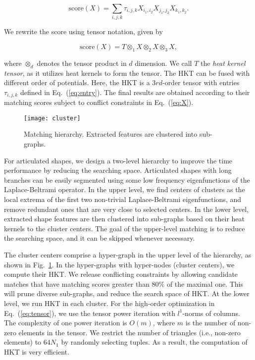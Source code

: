 \begin{equation}
\mbox{score}(X)=\sum_{i,j,k} \tau_{i,j,k} X_{i_{1},i_{2}} X_{j_{1},j_{2}} X_{k_{1},k_{2}}.
\end{equation}

We rewrite the score using tensor notation, given by

\begin{equation}\label{eq:tensor}
\mbox{score}(X)=T\otimes_{1}X\otimes_{2}X\otimes_{3}X,
\end{equation}

where $\otimes_{d}$ denotes the tensor product in $d$ dimension. We call $T$ the \emph{heat kernel tensor}, as it utilizes heat kernels to form the tensor. The HKT can be fused with different order of potentials. Here, the HKT is a $3rd$-order tensor with entries $\tau_{i,j,k}$ defined in Eq.~(\ref{eq:entry}). The final results are obtained according to their matching scores subject to conflict constraints in Eq.~(\ref{eq:X}).

\begin{figure}
\centering
\texttt{[image: cluster]}\\
\caption[Matching hierarchy.]
{Matching hierarchy. Extracted features are clustered into sub-graphs.}
\label{fig:cluster}
\end{figure}

For articulated shapes, we design a two-level hierarchy to improve the time performance by
reducing the searching space. Articulated shapes with long branches can be easily segmented
using some low frequency eigenfunctions of the Laplace-Beltrami operator. In the upper
level, we find centers of clusters as the local extrema of the first two non-trivial
Laplace-Beltrami eigenfunctions, and remove redundant ones that are very close to selected
centers. In the lower level, extracted shape features are then clustered into sub-graphs
based on their heat kernels to the cluster centers. The goal of the upper-level matching
is to reduce the searching space, and it can be skipped whenever necessary.

The cluster centers comprise a hyper-graph in the upper level of the hierarchy, as shown in Fig.~\ref{fig:cluster}. In the hyper-graphs with hyper-nodes (cluster centers), we compute their HKT. We release conflicting constraints by allowing candidate matches that have matching scores greater than $80\%$ of the maximal one. This will prune diverse sub-graphs, and reduce the search space of HKT. At the lower level, we run HKT in each cluster. For the high-order optimization in Eq.~(\ref{eq:tensor}), we use the tensor power iteration with $l^{1}$-norms of columns. The complexity of one power iteration is $O(m)$, where $m$ is the number of non-zero elements in the tensor. We restrict the number of triangles (i.e., non-zero elements) to $64N_1$ by randomly selecting tuples. As a result, the computation of HKT is very efficient.

